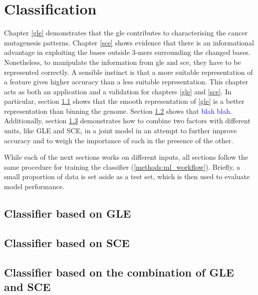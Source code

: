 \chapter{Classification}\label{ml}

Chapter \ref{gle} demonstrates that the \gls{gle} contributes to characterising the cancer mutagenesis patterns. Chapter \ref{sce} shows evidence that there is an informational advantage in exploiting the bases outside 3-mers surrounding the changed bases. Nonetheless, to manipulate the information from \gls{gle} and \gls{sce}, they have to be represented correctly. A sensible instinct is that a more suitable representation of a feature gives higher accuracy than a less suitable representation. This chapter acts as both an application and a validation for chapters \ref{gle} and \ref{sce}. In particular, section \ref{ml:gle} shows that the smooth representation of \ref{gle} is a better representation than binning the genome. Section \ref{ml:sce} shows that \textcolor{blue}{blah blah}. Additionally, section \ref{ml:both} demonstrates how to combine two factors with different units, like GLE and SCE, in a joint model in an attempt to further improve accuracy and to weigh the importance of each in the presence of the other.

While each of the next sections works on different inputs, all sections follow the same procedure for training the classifier (\ref{methods:ml_workflow}). Briefly, a small proportion of data is set aside as a test set, which is then used to evaluate model performance.

\section{Classifier based on GLE}\label{ml:gle}
\section{Classifier based on SCE}\label{ml:sce}
\section{Classifier based on the combination of GLE and SCE}\label{ml:both}